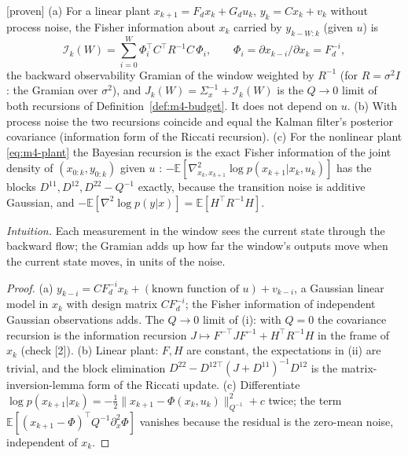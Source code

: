 \begin{proposition}\label{prop:m4-gramian}
[proven] (a) For a linear plant $x_{k+1}=F_dx_k+G_du_k$, $y_k=Cx_k+v_k$ without process noise, the Fisher
information about $x_k$ carried by $y_{k-W:k}$ (given $u$) is
\[
\mathcal I_k(W)=\sum_{i=0}^{W}\Phi_i^\top C^\top R^{-1}C\,\Phi_i,\qquad \Phi_i=\partial x_{k-i}/\partial x_k=F_d^{-i},
\]
the backward observability Gramian of the window weighted by $R^{-1}$ (for $R=\sigma^2I$: the Gramian over
$\sigma^2$), and $J_k(W)=\Sigma_x^{-1}+\mathcal I_k(W)$ is the $Q\to0$ limit of both recursions of
Definition~\ref{def:m4-budget}. It does not depend on $u$. (b) With process noise the two recursions coincide and
equal the Kalman filter's posterior covariance (information form of the Riccati recursion). (c) For the nonlinear
plant \eqref{eq:m4-plant} the Bayesian recursion is the exact Fisher information of the joint density of
$(x_{0:k},y_{0:k})$ given $u$ \citep[Prop.~1]{tichavsky1998posterior}: $-\mathbb E[\nabla^2_{x_k,x_{k+1}}\log p(x_{k+1}|x_k,u_k)]$
has the blocks $D^{11},D^{12},D^{22}-Q^{-1}$ exactly, because the transition noise is additive Gaussian, and
$-\mathbb E[\nabla^2\log p(y|x)]=\mathbb E[H^\top R^{-1}H]$.
\end{proposition}
\emph{Intuition.} Each measurement in the window sees the current state through the backward flow; the Gramian
adds up how far the window's outputs move when the current state moves, in units of the noise.
\begin{proof}
(a) $y_{k-i}=C F_d^{-i}x_k+(\text{known function of }u)+v_{k-i}$, a Gaussian linear model in $x_k$ with design
matrix $CF_d^{-i}$; the Fisher information of independent Gaussian observations adds. The $Q\to0$ limit of (i):
with $Q=0$ the covariance recursion is the information recursion $J\mapsto F^{-\top}JF^{-1}+H^\top R^{-1}H$ in
the frame of $x_k$ (check [2]). (b) Linear plant: $F,H$ are constant, the expectations in (ii) are trivial, and
the block elimination $D^{22}-D^{12\top}(J+D^{11})^{-1}D^{12}$ is the matrix-inversion-lemma form of the Riccati
update. (c) Differentiate $\log p(x_{k+1}|x_k)=-\tfrac12\|x_{k+1}-\Phi(x_k,u_k)\|^2_{Q^{-1}}+c$ twice; the term
$\mathbb E[(x_{k+1}-\Phi)^\top Q^{-1}\partial^2_{x}\Phi]$ vanishes because the residual is the zero-mean noise,
independent of $x_k$.
\end{proof}

